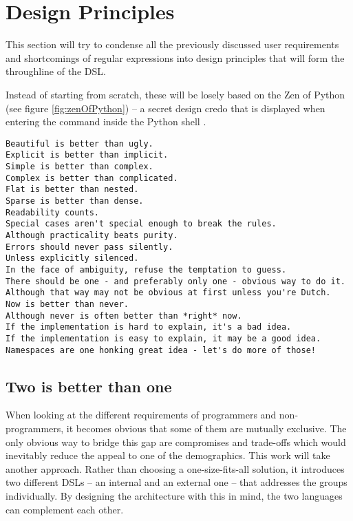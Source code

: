 \section{Design Principles} \label{sec:dslDesignPrinciples}

This section will try to condense all the previously discussed user requirements and shortcomings of regular expressions into design principles that will form the throughline of the DSL.

Instead of starting from scratch, these will be losely based on the Zen of Python (see figure \ref{fig:zenOfPython}) -- a secret design credo that is displayed when entering the command  inside the Python shell \cite{ZenOfPython}.

\begin{listingBox}[float=t!,title={The Zen of Python, by Tim Peters}, label=fig:zenOfPython]
\begin{lstlisting}[basicstyle=\footnotesize\ttfamily]
Beautiful is better than ugly. 
Explicit is better than implicit. 
Simple is better than complex. 
Complex is better than complicated. 
Flat is better than nested. 
Sparse is better than dense. 
Readability counts. 
Special cases aren't special enough to break the rules. 
Although practicality beats purity. 
Errors should never pass silently. 
Unless explicitly silenced. 
In the face of ambiguity, refuse the temptation to guess. 
There should be one - and preferably only one - obvious way to do it. 
Although that way may not be obvious at first unless you're Dutch. 
Now is better than never. 
Although never is often better than *right* now. 
If the implementation is hard to explain, it's a bad idea. 
If the implementation is easy to explain, it may be a good idea. 
Namespaces are one honking great idea - let's do more of those! 
\end{lstlisting}
\end{listingBox}

\subsection{Two is better than one} \label{sec:twoIsBetter}

When looking at the different requirements of programmers and non-programmers, it becomes obvious that some of them are mutually exclusive. The only obvious way to bridge this gap are compromises and trade-offs which would inevitably reduce the appeal to one of the demographics. This work will take another approach. Rather than choosing a one-size-fits-all solution, it introduces two different DSLs -- an internal and an external one -- that addresses the groups individually. By designing the architecture with this in mind, the two languages can complement each other.

